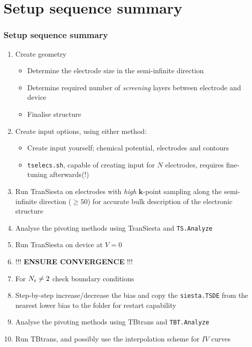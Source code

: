 \section{Setup sequence summary}

\begin{frame}
  \frametitle{Setup sequence summary}

  \begin{enumerate}%

    \item Create geometry
    \begin{itemize}
      \item Determine the electrode size in the semi-infinite direction

      \item Determine required number of \emph{screening} layers between electrode and device
      \item Finalise structure
    \end{itemize}

    \item Create input options, using either method:
    \begin{itemize}
      \item Create input yourself; chemical potential, electrodes and contours


      \item \texttt{tselecs.sh}, capable of creating input for $N$ electrodes, requires
      fine-tuning afterwards(!)

    \end{itemize}

    \item Run TranSiesta on electrodes with \emph{high} $\mathbf k$-point sampling along
    the semi-infinite direction ($\ge50$)
    for accurate bulk description of the electronic structure

    \item Analyse the pivoting methods using TranSiesta and \texttt{TS.Analyze}

    \item Run TranSiesta on device at $V=0$

    \item !!! \textbf{ENSURE CONVERGENCE} !!!

    \item For $N_{\mathfrak{e}}\neq2$ check boundary conditions

    \item Step-by-step increase/decrease the bias and copy the \texttt{siesta.TSDE} from
    the nearest lower bias to the folder for restart capability

    \item Analyse the pivoting methods using TBtrans and \texttt{TBT.Analyze}

    \item Run TBtrans, and possibly use the interpolation scheme for $IV$ curves

  \end{enumerate}

\end{frame}

